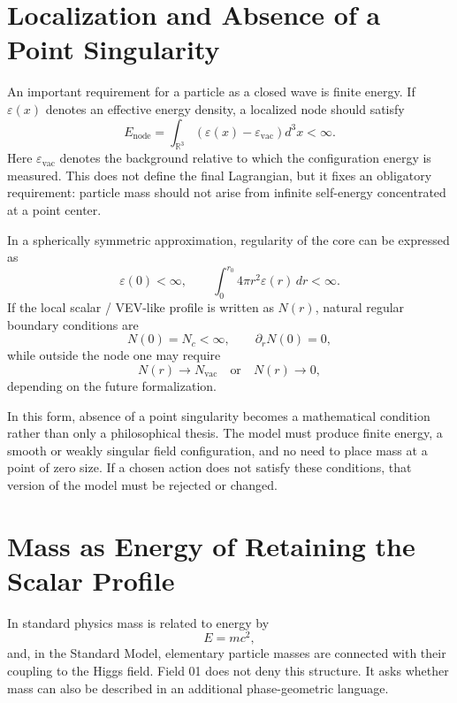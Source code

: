 \documentclass[11pt,a4paper]{article}
\begin{document}
\section{Localization and Absence of a Point Singularity}

An important requirement for a particle as a closed wave is finite energy. If $\varepsilon(x)$ denotes an effective energy density, a localized node should satisfy
\begin{equation}
E_{\mathrm{node}}=\int_{\mathbb{R}^3}\left(\varepsilon(x)-\varepsilon_{\mathrm{vac}}\right)d^3x<\infty.
\end{equation}
Here $\varepsilon_{\mathrm{vac}}$ denotes the background relative to which the configuration energy is measured. This does not define the final Lagrangian, but it fixes an obligatory requirement: particle mass should not arise from infinite self-energy concentrated at a point center.

In a spherically symmetric approximation, regularity of the core can be expressed as
\begin{equation}
\varepsilon(0)<\infty, \qquad \int_0^{r_0}4\pi r^2\varepsilon(r)\,dr<\infty.
\end{equation}
If the local scalar / VEV-like profile is written as $N(r)$, natural regular boundary conditions are
\begin{equation}
N(0)=N_c<\infty, \qquad \partial_rN(0)=0,
\end{equation}
while outside the node one may require
\begin{equation}
N(r)\to N_{\mathrm{vac}} \quad \text{or} \quad N(r)\to 0,
\end{equation}
depending on the future formalization.

In this form, absence of a point singularity becomes a mathematical condition rather than only a philosophical thesis. The model must produce finite energy, a smooth or weakly singular field configuration, and no need to place mass at a point of zero size. If a chosen action does not satisfy these conditions, that version of the model must be rejected or changed.

\section{Mass as Energy of Retaining the Scalar Profile}

In standard physics mass is related to energy by
\begin{equation}
E = mc^2,
\end{equation}
and, in the Standard Model, elementary particle masses are connected with their coupling to the Higgs field. Field 01 does not deny this structure. It asks whether mass can also be described in an additional phase-geometric language.
\end{document}
